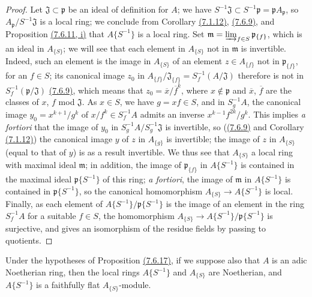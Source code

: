 \begin{proof}
\label{proof-0.7.6.17}
Let $\mathfrak{J}\subset\mathfrak{p}$ be an ideal of definition for $A$; we have
$S^{-1}\mathfrak{J}\subset S^{-1}\mathfrak{p}=\mathfrak{p}A_\mathfrak{p}$, so
$A_\mathfrak{p}/S^{-1}\mathfrak{J}$ is a local ring; we conclude from 
Corollary \hyperref[0.7.1.12]{(7.1.12)}, \hyperref[0.7.6.9]{(7.6.9)}, and
Proposition \hyperref[0.7.6.11]{(7.6.11, i)} that $A\{S^{-1}\}$ is a local ring. Set
$\mathfrak{m}=\varinjlim_{f\in S}\mathfrak{p}_{\{f\}}$, which is an ideal in $A_{\{S\}}$; we
will see that each element in $A_{\{S\}}$ not in $\mathfrak{m}$ is invertible. Indeed, such an
element is the image in $A_{\{S\}}$ of an element $z\in A_{\{f\}}$ not in $\mathfrak{p}_{\{f\}}$,
for an $f\in S$; its canonical image $z_0$ in
$A_{\{f\}}/\mathfrak{J}_{\{f\}}=S_f^{-1}(A/\mathfrak{J})$ therefore is not in
$S_f^{-1}(\mathfrak{p}/\mathfrak{J})$ \hyperref[0.7.6.9]{(7.6.9)}, which means that
$z_0=\overline{x}/\overline{f}^k$, where $x\not\in\mathfrak{p}$ and $\overline{x}$, $\overline{f}$
are the classes of $x$, $f$ mod $\mathfrak{J}$. As $x\in S$, we have $g=xf\in S$, and in
$S_g^{-1}A$, the canonical image $y_0=x^{k+1}/g^k$ of $x/f^k\in S_f^{-1}A$ admits an inverse
$x^{k-1}f^{2k}/g^k$. This implies {\em a fortiori} that the image of $y_0$ in
$S_g^{-1}A/S_g^{-1}\mathfrak{J}$ is invertible, so (\hyperref[0.7.6.9]{(7.6.9)} and
Corollary \hyperref[0.7.1.12]{(7.1.12)}) the canonical image $y$ of $z$ in $A_{\{g\}}$ is
invertible; the image of $z$ in $A_{\{S\}}$ (equal to that of $y$) is as a result invertible.
We thus see that $A_{\{S\}}$ a local ring with maximal ideal $\mathfrak{m}$; in addition, the image
of $\mathfrak{p}_{\{f\}}$ in $A\{S^{-1}\}$ is contained in the maximal ideal $\mathfrak{p}\{S^{-1}\}$
of this ring; {\em a fortiori}, the image of $\mathfrak{m}$ in $A\{S^{-1}\}$ is contained in
$\mathfrak{p}\{S^{-1}\}$, so the canonical homomorphism $A_{\{S\}}\to A\{S^{-1}\}$ is local. Finally,
as each element of $A\{S^{-1}\}/\mathfrak{p}\{S^{-1}\}$ is the image of an element in the ring
$S_f^{-1}A$ for a suitable $f\in S$, the homomorphism $A_{\{S\}}\to A\{S^{-1}\}/\mathfrak{p}\{S^{-1}\}$
is surjective, and gives an isomorphism of the residue fields by passing to quotients.
\end{proof}

\begin{cor}[7.6.18]
\label{0.7.6.18}
Under the hypotheses of Proposition \hyperref[0.7.6.17]{(7.6.17)}, if we suppose also that
$A$ is an adic Noetherian ring, then the local rings $A\{S^{-1}\}$ and $A_{\{S\}}$ are Noetherian,
and $A\{S^{-1}\}$ is a faithfully flat $A_{\{S\}}$-module.
\end{cor}

